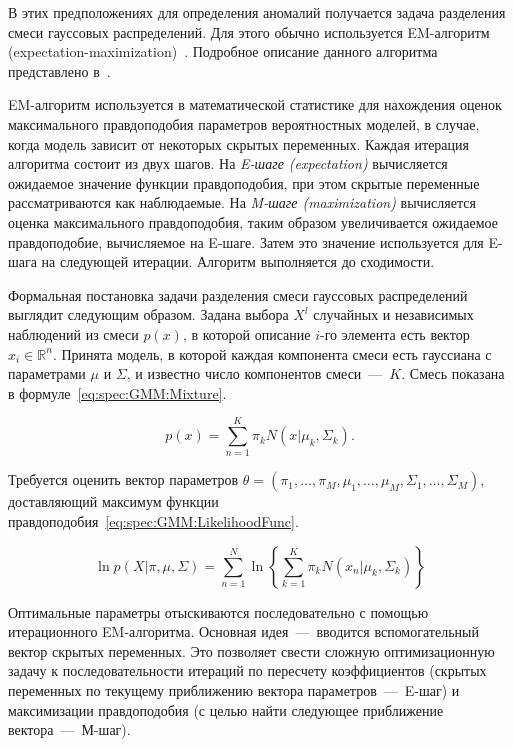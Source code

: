 В этих предположениях для определения аномалий получается задача разделения смеси гауссовых распределений. Для этого обычно используется EM-алгоритм (expectation-maximization)~\cite{MartinCompUnsupervisedDetectionMethods}. Подробное описание данного алгоритма представлено в~\cite{KorolevEMAlgo}.

EM-алгоритм используется в математической статистике для нахождения оценок максимального правдоподобия параметров вероятностных моделей, в случае, когда модель зависит от некоторых скрытых переменных. Каждая итерация алгоритма состоит из двух шагов. На \textit{E-шаге (expectation)} вычисляется ожидаемое значение функции правдоподобия, при этом скрытые переменные рассматриваются как наблюдаемые. На \textit{M-шаге (maximization)} вычисляется оценка максимального правдоподобия, таким образом увеличивается ожидаемое правдоподобие, вычисляемое на E-шаге. Затем это значение используется для E-шага на следующей итерации. Алгоритм выполняется до сходимости.

Формальная постановка задачи разделения смеси гауссовых распределений выглядит следующим образом. Задана выбора $X^l$ случайных и независимых наблюдений из смеси $p(x)$, в которой описание $i$-го элемента есть вектор $x_i\in \mathbb{R}^n$. Принята модель, в которой каждая компонента смеси есть гауссиана с параметрами $\mu$ и $\Sigma$, и известно число компонентов смеси~---~$K$. Смесь показана в формуле~\eqref{eq:spec:GMM:Mixture}.

\begin{equation} \label{eq:spec:GMM:Mixture}
p(x) = \sum_{n=1}^{K} \pi_k N(x|\mu_k,\Sigma_k).
\end{equation}

Требуется оценить вектор параметров $\theta = (\pi_1,\dots,\pi_M,\mu_1,\dots,\mu_M,\Sigma_1,\dots,\Sigma_M)$, доставляющий максимум функции правдоподобия~\eqref{eq:spec:GMM:LikelihoodFunc}.

\begin{equation} \label{eq:spec:GMM:LikelihoodFunc}
\ln p(X|\pi,\mu,\Sigma) = \sum_{n=1}^{N} \ln \left\{\sum_{k=1}^{K} \pi_k N(x_n|\mu_k,\Sigma_k)\right\}
\end{equation}

Оптимальные параметры отыскиваются последовательно с помощью итерационного EM-алгоритма. Основная идея~–--~вводится вспомогательный вектор скрытых переменных. Это позволяет свести сложную оптимизационную задачу к последовательности итераций по пересчету коэффициентов (скрытых переменных по текущему приближению вектора параметров~---~E-шаг) и максимизации правдоподобия (с целью найти следующее приближение вектора~---~М-шаг).

